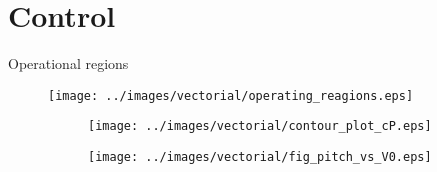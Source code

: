   
    



%   

                                   
\section{Control}
\begin{frame}{Operational regions}

  \begin{figure}[H]
    \centering
    \texttt{[image: ../images/vectorial/operating\_reagions.eps]}
  \end{figure}

  \begin{figure}
    \centering
    \begin{subfigure}{0.49\textwidth}
      \centering
      \texttt{[image: ../images/vectorial/contour\_plot\_cP.eps]}
    \end{subfigure}
    \begin{subfigure}{0.49\textwidth}
      \centering
      \texttt{[image: ../images/vectorial/fig\_pitch\_vs\_V0.eps]}
    \end{subfigure}
  \end{figure}

\end{frame}

